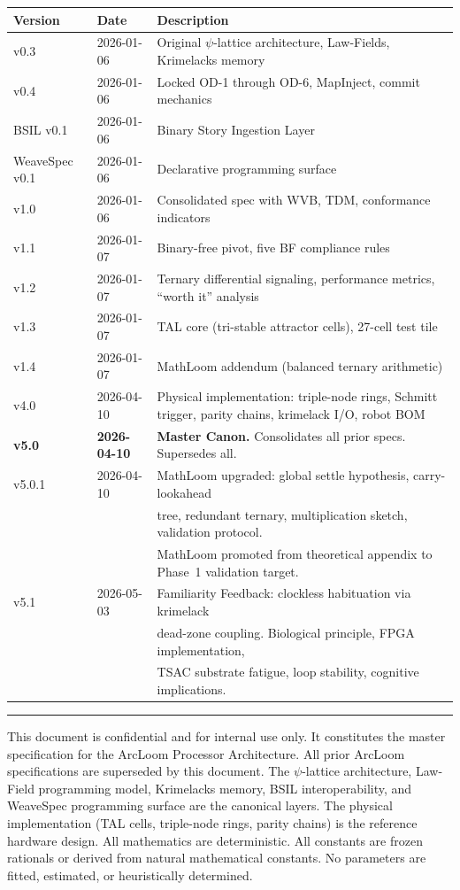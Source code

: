 \documentclass[11pt, a4paper]{report}
\begin{document}
\begin{longtable}{@{}lll@{}}
\toprule
\textbf{Version} & \textbf{Date} & \textbf{Description} \\
\midrule
\endhead
v0.3 & 2026-01-06 & Original $\psi$-lattice architecture, Law-Fields, Krimelacks memory \\
v0.4 & 2026-01-06 & Locked OD-1 through OD-6, MapInject, commit mechanics \\
BSIL v0.1 & 2026-01-06 & Binary Story Ingestion Layer \\
WeaveSpec v0.1 & 2026-01-06 & Declarative programming surface \\
v1.0 & 2026-01-06 & Consolidated spec with WVB, TDM, conformance indicators \\
v1.1 & 2026-01-07 & Binary-free pivot, five BF compliance rules \\
v1.2 & 2026-01-07 & Ternary differential signaling, performance metrics, ``worth it'' analysis \\
v1.3 & 2026-01-07 & TAL core (tri-stable attractor cells), 27-cell test tile \\
v1.4 & 2026-01-07 & MathLoom addendum (balanced ternary arithmetic) \\
v4.0 & 2026-04-10 & Physical implementation: triple-node rings, Schmitt trigger, parity chains,
                     krimelack I/O, robot BOM \\
\textbf{v5.0} & \textbf{2026-04-10} & \textbf{Master Canon.} Consolidates all prior specs. Supersedes all. \\
v5.0.1 & 2026-04-10 & MathLoom upgraded: global settle hypothesis, carry-lookahead \\
       &            & tree, redundant ternary, multiplication sketch, validation protocol. \\
       &            & MathLoom promoted from theoretical appendix to Phase~1 validation target. \\
v5.1 & 2026-05-03 & Familiarity Feedback: clockless habituation via krimelack \\
     &            & dead-zone coupling. Biological principle, FPGA implementation, \\
     &            & TSAC substrate fatigue, loop stability, cognitive implications. \\
\bottomrule
\end{longtable}

\vspace{2em}
\hrule
\vspace{0.5em}
{\color{al-gray}\small This document is confidential and for internal use only.
It constitutes the master specification for the ArcLoom Processor
Architecture. All prior ArcLoom specifications are superseded by this
document. The $\psi$-lattice architecture, Law-Field programming model,
Krimelacks memory, BSIL interoperability, and WeaveSpec programming
surface are the canonical layers. The physical implementation (TAL cells,
triple-node rings, parity chains) is the reference hardware design. All
mathematics are deterministic. All constants are frozen rationals or
derived from natural mathematical constants. No parameters are fitted,
estimated, or heuristically determined.}
\end{document}
